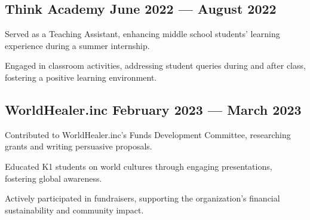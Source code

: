 \documentclass[a4paper,12pt]{article}
\begin{document}
\subsection{{Think Academy \hfill June 2022 --- August 2022}}
\vspace*{3pt}
\begin{zitemize}
\item Served as a Teaching Assistant, enhancing middle school students' learning experience during a summer internship.
\item Engaged in classroom activities, addressing student queries during and after class, fostering a positive learning environment.
\end{zitemize}

\subsection{{WorldHealer.inc \hfill February 2023 --- March 2023}}
\vspace*{3pt}
\begin{zitemize}
\item Contributed to WorldHealer.inc's Funds Development Committee, researching grants and writing persuasive proposals.
\item Educated K1 students on world cultures through engaging presentations, fostering global awareness.
\item Actively participated in fundraisers, supporting the organization's financial sustainability and community impact.
\end{zitemize}
\end{document}

